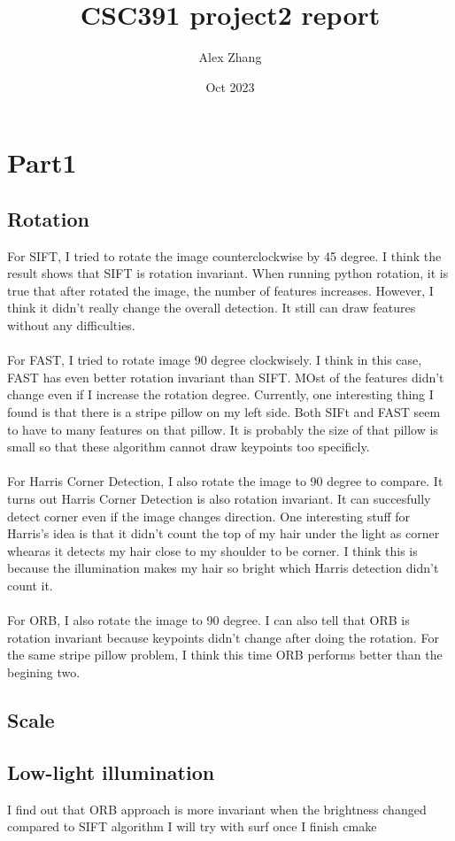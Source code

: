\documentclass{article}
\title{CSC391 project2 report}
\author{Alex Zhang}
\date{Oct 2023}
\begin{document}
\maketitle
\section*{Part1}
\subsection*{Rotation}
For SIFT, I tried to rotate the image counterclockwise by 45 degree.
I think the result shows that SIFT is rotation invariant. 
When running python rotation, it is true that after rotated the image, the number of features increases.
However, I think it didn't really change the overall detection. 
It still can draw features without any difficulties.\\
\\
For FAST, I tried to rotate image 90 degree clockwisely.
I think in this case, FAST has even better rotation invariant than SIFT.
MOst of the features didn't change even if I increase the rotation degree.
Currently, one interesting thing I found is that there is a stripe pillow on my left side.
Both SIFt and FAST seem to have to many features on that pillow. 
It is probably the size of that pillow is small so that these algorithm cannot draw keypoints too specificly.\\
\\
For Harris Corner Detection, I also rotate the image to 90 degree to compare.
It turns out Harris Corner Detection is also rotation invariant.
It can succesfully detect corner even if the image changes direction.
One interesting stuff for Harris's idea is that it didn't count the top of my hair under the light as corner whearas it detects my hair close to my shoulder to be corner.
I think this is because the illumination makes my hair so bright which Harris detection didn't count it.\\
\\
For ORB, I also rotate the image to 90 degree.
I can also tell that ORB is rotation invariant because keypoints didn't change after doing the rotation.
For the same stripe pillow problem, I think this time ORB performs better than the begining two.
\subsection*{Scale}



\subsection*{Low-light illumination}



I find out that ORB approach is more invariant when the brightness changed compared to SIFT algorithm
I will try with surf once I finish cmake
\end{document}
